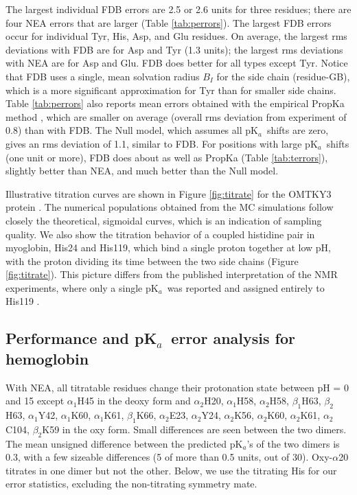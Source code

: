 \documentclass[a4paper,12pt]{article}
\newcommand{\pk}{pK$_a$}
\begin{document}
The largest individual FDB errors are 2.5 or 2.6 units for three residues; there are four NEA errors
that are larger (Table \ref{tab:perrors}). The largest FDB errors occur for individual Tyr, His, Asp,
and Glu residues. On average, the largest rms deviations with FDB are for Asp and Tyr (1.3 units); the
largest rms deviations with NEA are for Asp and Glu. FDB does better for all types except Tyr. Notice
that FDB uses a single, mean solvation radius $B_I$ for the side chain (residue-GB), which is a more
significant approximation for Tyr than for smaller side chains. Table \ref{tab:perrors} also reports
mean errors obtained with the empirical PropKa method \cite{Bas08,Olsson11a}, which are smaller on average
(overall rms deviation from experiment of 0.8) than with FDB. The Null model, which assumes all \pk\ shifts
are zero, gives an rms deviation of 1.1, similar to FDB. For positions with large \pk\ shifts (one unit or
more), FDB does about as well as PropKa (Table \ref{tab:terrors}), slightly better than NEA, and much better
than the Null model.

Illustrative titration curves are shown in Figure \ref{fig:titrate} for the OMTKY3 protein . The numerical
populations obtained from the MC simulations follow closely the theoretical, sigmoidal curves, which is an
indication of sampling quality. We also show the titration behavior of a coupled histidine pair in myoglobin,
His24 and His119, which bind a single proton together at low pH, with the proton dividing its time between
the two side chains (Figure \ref{fig:titrate}). This picture differs from the published interpretation of the
NMR experiments, where only a single \pk\ was reported and assigned entirely to His119 \cite{Bashford93}.

\subsection{Performance and \pk\ error analysis for hemoglobin}
With NEA, all titratable residues change their protonation state between pH = 0 and 15 except $\alpha_1$H45
in the deoxy form and $\alpha_2$H20, $\alpha_1$H58, $\alpha_2$H58, $\beta_1$H63, $\beta_2$H63, $\alpha_1$Y42,
$\alpha_1$K60, $\alpha_1$K61, $\beta_1$K66, $\alpha_2$E23, $\alpha_2$Y24, $\alpha_2$K56, $\alpha_2$K60,
$\alpha_2$K61, $\alpha_2$C104, $\beta_2$K59 in the oxy form. Small differences are seen between the two
dimers. The mean unsigned difference between the predicted \pk's of the two dimers is 0.3, with a few
sizeable differences (5 of more than 0.5 units, out of 30). Oxy-$\alpha$20 titrates in one dimer but not
the other. Below, we use the titrating His for our error statistics, excluding the non-titrating symmetry mate.
\end{document}

